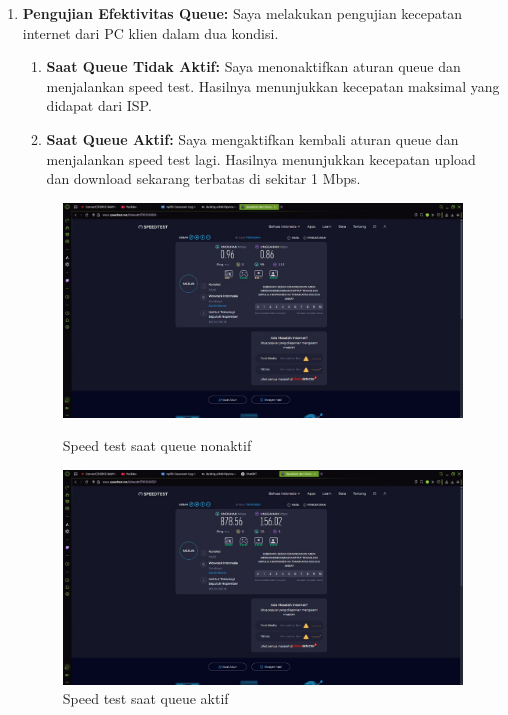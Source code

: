 \begin{enumerate}
    \item \textbf{Pengujian Efektivitas Queue:} Saya melakukan pengujian kecepatan internet dari PC klien dalam dua kondisi.
    \begin{enumerate}[label*=\alph*.]
        \item \textbf{Saat Queue Tidak Aktif:} Saya menonaktifkan aturan queue dan menjalankan speed test. Hasilnya menunjukkan kecepatan maksimal yang didapat dari ISP.
        \item \textbf{Saat Queue Aktif:} Saya mengaktifkan kembali aturan queue dan menjalankan speed test lagi. Hasilnya menunjukkan kecepatan upload dan download sekarang terbatas di sekitar 1 Mbps.
    \end{enumerate}
     \begin{figure}[H]
        \centering
        \begin{minipage}{0.48\textwidth}
            \centering
            \includegraphics[width=\textwidth]{img5/Queuenonaktif.jpeg}
            \caption*{Speed test saat queue nonaktif}
        \end{minipage}\hfill
        \begin{minipage}{0.48\textwidth}
            \centering
            \includegraphics[width=\textwidth]{img5/Queueaktif.jpeg} 
            \caption*{Speed test saat queue aktif}
        \end{minipage}
    \end{figure}
\end{enumerate}

